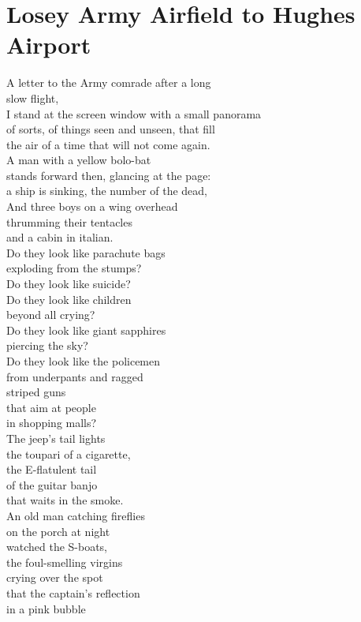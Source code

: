 \documentclass[smalldemyvopaper,11pt,twoside,onecolumn,openright,extrafontsizes]{memoir}
\begin{document}
\chapter{Losey Army Airfield to Hughes Airport}
A letter to the Army comrade after a long
\\slow flight,
\\I stand at the screen window with a small panorama
\\of sorts, of things seen and unseen, that fill
\\the air of a time that will not come again.
\\A man with a yellow bolo-bat
\\stands forward then, glancing at the page:
\\a ship is sinking, the number of the dead,
\\And three boys on a wing overhead
\\thrumming their tentacles
\\and a cabin in italian.
\\Do they look like parachute bags
\\exploding from the stumps?
\\Do they look like suicide?
\\Do they look like children
\\beyond all crying?
\\Do they look like giant sapphires
\\piercing the sky?
\\Do they look like the policemen
\\from underpants and ragged
\\striped guns
\\that aim at people
\\in shopping malls?
\\The jeep's tail lights
\\the toupari of a cigarette,
\\the E-flatulent tail
\\of the guitar banjo
\\that waits in the smoke.
\\An old man catching fireflies
\\on the porch at night
\\watched the S-boats,
\\the foul-smelling virgins
\\crying over the spot
\\that the captain's reflection
\\in a pink bubble
\end{document}
